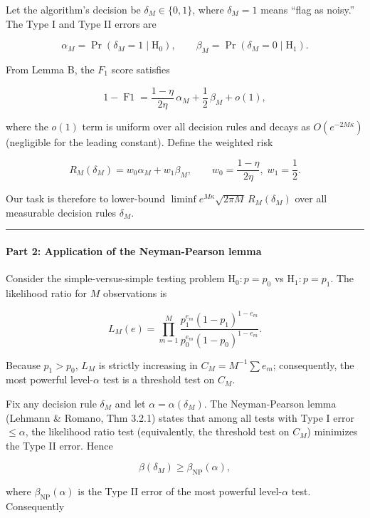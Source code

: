 \documentclass[12pt]{article}
\begin{document}
Let the algorithm's decision be \(\delta_M \in \{0,1\}\), where
\(\delta_M=1\) means ``flag as noisy.'' The Type I and Type II errors
are

\[
\alpha_M = \Pr(\delta_M=1 \mid \mathrm{H}_0),\qquad
\beta_M = \Pr(\delta_M=0 \mid \mathrm{H}_1).
\]

From Lemma B, the \(F_1\) score satisfies

\[
1 - \operatorname{F1} = \frac{1-\eta}{2\eta}\,\alpha_M + \frac12\,\beta_M + o(1),
\]

where the \(o(1)\) term is uniform over all decision rules and decays as
\(O(e^{-2M\kappa})\) (negligible for the leading constant). Define the
weighted risk

\[
R_M(\delta_M) = w_0\alpha_M + w_1\beta_M,\qquad
w_0 = \frac{1-\eta}{2\eta},\; w_1 = \frac12.
\]

Our task is therefore to lower-bound
\(\liminf e^{M\kappa}\sqrt{2\pi M}\,R_M(\delta_M)\) over all measurable
decision rules \(\delta_M\).

\begin{center}\rule{0.5\linewidth}{0.5pt}\end{center}

\paragraph{Part 2: Application of the Neyman-Pearson
lemma}\label{part-2-application-of-the-neyman-pearson-lemma}

Consider the simple-versus-simple testing problem
\(\mathrm{H}_0: p=p_0\) vs \(\mathrm{H}_1: p=p_1\). The likelihood ratio
for \(M\) observations is

\[
L_M(e) = \prod_{m=1}^M \frac{p_1^{e_m}(1-p_1)^{1-e_m}}{p_0^{e_m}(1-p_0)^{1-e_m}}.
\]

Because \(p_1>p_0\), \(L_M\) is strictly increasing in
\(C_M = M^{-1}\sum e_m\); consequently, the most powerful
level-\(\alpha\) test is a threshold test on \(C_M\).

Fix any decision rule \(\delta_M\) and let
\(\alpha = \alpha(\delta_M)\). The Neyman-Pearson lemma (Lehmann \&
Romano, Thm 3.2.1) states that among all tests with Type I error
\(\le \alpha\), the likelihood ratio test (equivalently, the threshold
test on \(C_M\)) minimizes the Type II error. Hence

\[
\beta(\delta_M) \ge \beta_{\mathrm{NP}}(\alpha),
\]

where \(\beta_{\mathrm{NP}}(\alpha)\) is the Type II error of the most
powerful level-\(\alpha\) test. Consequently
\end{document}
